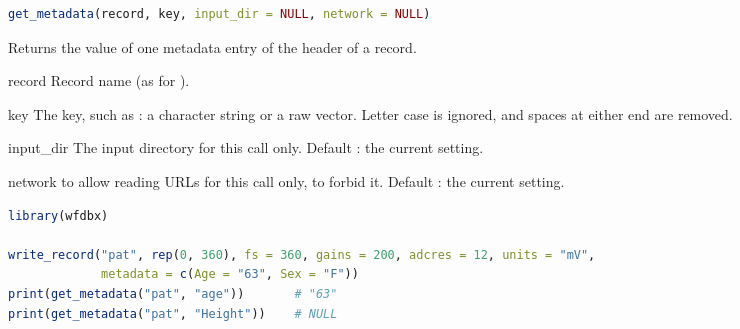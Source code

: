 \begin{lstlisting}[language=R,style=signature]
get_metadata(record, key, input_dir = NULL, network = NULL)
\end{lstlisting}
Returns the value of one metadata entry of the header of a record.
\begin{params}
\item[record] Record name (as for ).
\item[key] The key, such as : a character string or a raw vector. Letter case
  is ignored, and spaces at either end are removed.
\item[input\_dir] The input directory for this call only. Default : the
  current setting.
\item[network]  to allow reading URLs for this call only,  to
  forbid it. Default : the current setting.
\end{params}
\begin{lstlisting}[language=R,style=example]
library(wfdbx)

write_record("pat", rep(0, 360), fs = 360, gains = 200, adcres = 12, units = "mV",
             metadata = c(Age = "63", Sex = "F"))
print(get_metadata("pat", "age"))       # "63"
print(get_metadata("pat", "Height"))    # NULL
\end{lstlisting}


